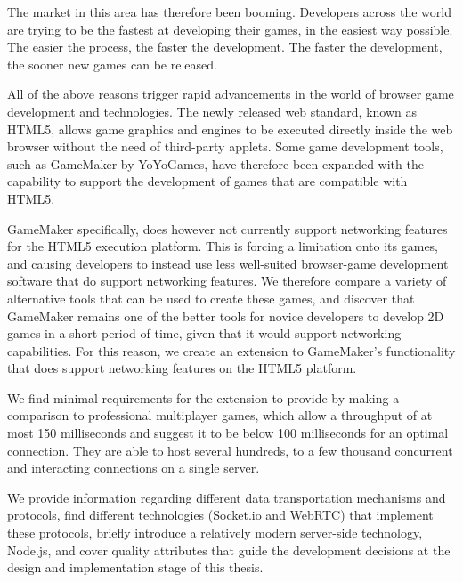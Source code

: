 \documentclass[bsc, 12pt, twoside, singlespacing, parskip, abbrevs, notimes, normalheadings, logo]{styles/infthesis}
\begin{document}
\vspace{1em}
The market in this area has therefore been booming. Developers across the world are trying to be the fastest at developing their games, in the easiest way possible. The easier the process, the faster the development. The faster the development, the sooner new games can be released.

\vspace{1em}
All of the above reasons trigger rapid advancements in the world of browser game development and technologies. The newly released web standard, known as HTML5, allows game graphics and engines to be executed directly inside the web browser without the need of third-party applets. Some game development tools, such as GameMaker by YoYoGames, have therefore been expanded with the capability to support the development of games that are compatible with HTML5.

\vspace{1em}
GameMaker specifically, does however not currently support networking features for the HTML5 execution platform. This is forcing a limitation onto its games, and causing developers to instead use less well-suited browser-game development software that do support networking features. We therefore compare a variety of alternative tools that can be used to create these games, and discover that GameMaker remains one of the better tools for novice developers to develop 2D games in a short period of time, given that it would support networking capabilities. For this reason, we create an extension to GameMaker's functionality that does support networking features on the HTML5 platform.

\vspace{2em}
We find minimal requirements for the extension to provide by making a comparison to professional multiplayer games, which allow a throughput of at most 150 milliseconds and suggest it to be below 100 milliseconds for an optimal connection. They are able to host several hundreds, to a few thousand concurrent and interacting connections on a single server. 

\vspace{1em}
We provide information regarding different data transportation mechanisms and protocols, find different technologies (Socket.io and WebRTC) that implement these protocols, briefly introduce a relatively modern server-side technology, Node.js, and cover quality attributes that guide the development decisions at the design and implementation stage of this thesis.
\end{document}

